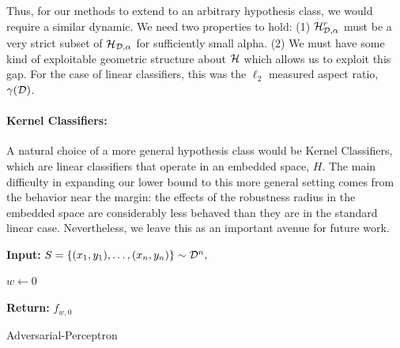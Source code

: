 Thus, for our methods to extend to an arbitrary hypothesis class, we would require a similar dynamic. We need two properties to hold: (1) $\mathcal H_{{\mathcal D}, \alpha}^r$ must be a very strict subset of $\mathcal H_{{\mathcal D}, \alpha}$ for sufficiently small alpha. (2) We must have some kind of exploitable geometric structure about $\mathcal H$ which allows us to exploit this gap. For the case of linear classifiers, this was the $\ell_2$ measured aspect ratio, $\gamma({\mathcal D})$. 

\paragraph{Kernel Classifiers: } A natural choice of a more general hypothesis class would be Kernel Classifiers, which are linear classifiers that operate in an embedded space, $H$. The main difficulty in expanding our lower bound to this more general setting comes from the behavior near the margin: the effects of the robustness radius in the embedded space are considerably less behaved than they are in the standard linear case. Nevertheless, we leave this as an important avenue for future work.


\begin{algorithm}[H]
    \SetAlgoLined
    {\bfseries Input:} $S = \{(x_1, y_1), \dots, (x_n, y_n)\} \sim {\mathcal D}^n,$\;
    
    $w \leftarrow 0$ \;
    
    
    {\bfseries Return:} $f_{w, 0}$\;
    

\caption{Adversarial-Perceptron}\label{alg:upper_bound}
\end{algorithm}

